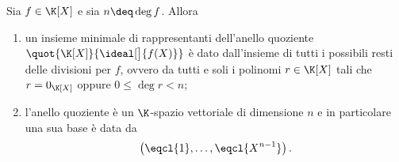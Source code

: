 \begin{theorem}\label{th:caratt_quot_polinomi}
    Sia $f \in \K[X]$ e sia $n \deq \deg f$. Allora \begin{enumerate}[label={(\roman*)}]
        \item un insieme minimale di rappresentanti dell'anello quoziente $\quot{\K[X]}{\ideal[\big]{f(X)}}$ è dato dall'insieme di tutti i possibili resti delle divisioni per $f$, ovvero da tutti e soli i polinomi $r \in \K[X]$ tali che $r = 0_{\K[X]}$ oppure $0 \leq \deg r < n$;
        \item l'anello quoziente è un $\K$-spazio vettoriale di dimensione $n$ e in particolare una sua base è data da \[
            \left( \eqcl{1}, \dots, \eqcl{X^{n-1}} \right).
        \]
    \end{enumerate}
\end{theorem}
